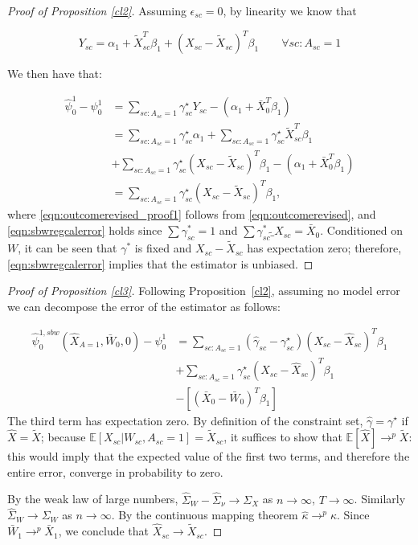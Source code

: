 \begin{proof}[Proof of Proposition \ref{cl2}]
Assuming $\epsilon_{sc} = 0$, by linearity we know that

\begin{equation}\label{eqn:outcomerevised}
Y_{sc} = \alpha_1 + \tilde{X}_{sc}^T\beta_1 + (X_{sc} - \tilde{X}_{sc})^T\beta_1 \qquad \forall sc: A_{sc} = 1
\end{equation}

We then have that:

\begin{align}\nonumber
    \hat{\psi}^1_0 - \psi_0^1 &= \sum_{sc: A_{sc} = 1}\gamma_{sc}^\star Y_{sc} - (\alpha_1 + \bar{X}_0^T\beta_1) \\
    \nonumber &= \sum_{sc: A_{sc} = 1}\gamma_{sc}^\star\alpha_1 + \sum_{sc: A_{sc} = 1}\gamma_{sc}^\star\tilde{X}_{sc}^T\beta_1 \\ 
    &+ \sum_{sc: A_{sc} = 1}\gamma_{sc}^\star(X_{sc} - \tilde{X}_{sc})^T\beta_1 - (\alpha_1 + \bar{X}_0^T\beta_1) \label{eqn:outcomerevised_proof1}\\
    &= \sum_{sc: A_{sc} = 1}\gamma_{sc}^\star(X_{sc} - \tilde{X}_{sc})^T\beta_1\label{eqn:sbwregcalerror},
\end{align}
where \eqref{eqn:outcomerevised_proof1} follows from \eqref{eqn:outcomerevised}, and \eqref{eqn:sbwregcalerror} holds since $\sum \gamma_{sc}^* = 1$ and $\sum \gamma_{sc}^* \tilde_{X}_{sc} = \bar{X}_0$. Conditioned on $W$, it can be seen that $\gamma^*$ is fixed and $X_{sc} - \tilde{X}_{sc}$ has expectation zero; therefore, \eqref{eqn:sbwregcalerror} implies that the estimator is unbiased.
\end{proof}

\begin{proof}[Proof of Proposition \ref{cl3}]
Following Proposition~\ref{cl2}, assuming no model error we can decompose the error of the estimator as follows:

\begin{align*}\nonumber
    \hat{\psi}^{1, sbw}_0(\hat{X}_{A=1}, \bar{W}_0, 0) - \psi_0^1 &= \sum_{sc: A_{sc} = 1}(\hat{\gamma}_{sc} - \gamma_{sc}^\star)(X_{sc} - \hat{X}_{sc})^T\beta_1 \\
    & + \sum_{sc: A_{sc} = 1}\gamma_{sc}^\star(X_{sc} - \hat{X}_{sc})^T\beta_1 \\
    &- [(\bar{X}_0 - \bar{W}_0)^T\beta_1]
\end{align*}
%
The third term has expectation zero. By definition of the constraint set, $\hat{\gamma} = \gamma^\star$ if $\hat{X} = \tilde{X}$; because $\mathbb{E}[X_{sc} | W_{sc}, A_{sc} = 1] = \tilde{X}_{sc}$, it suffices to show that $\mathbb{E}[\hat{X}] \to^p \tilde{X}$: this would imply that the expected value of the first two terms, and therefore the entire error, converge in probability to zero.

By the weak law of large numbers, $\hat{\Sigma}_W - \hat{\Sigma}_{\nu} \to \Sigma_{X}$ as $n \to \infty$, $T \to \infty$. Similarly $\hat{\Sigma}_W \to \Sigma_W$ as $n \to \infty$. By the continuous mapping theorem $\hat{\kappa} \to^p \kappa$. Since $\bar{W}_1 \to^p \bar{X}_1$, we conclude that $\hat{X}_{sc} \to \tilde{X}_{sc}$. 
\end{proof}

